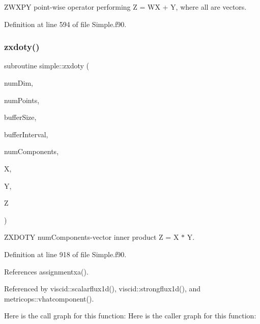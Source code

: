 Z\+W\+X\+PY point-\/wise operator performing Z = WX + Y, where all are vectors. 



Definition at line 594 of file Simple.\+f90.

\hypertarget{namespacesimple_a2b4272d0270d7a065ce43682e88e3cf6}{}\label{namespacesimple_a2b4272d0270d7a065ce43682e88e3cf6} 
\subsubsection{\texorpdfstring{zxdoty()}{zxdoty()}}
{\footnotesize\ttfamily subroutine simple\+::zxdoty (\begin{DoxyParamCaption}\item[{integer(kind=4), intent(in)}]{num\+Dim,  }\item[{integer(kind=8), intent(in)}]{num\+Points,  }\item[{integer(kind=8), dimension(numdim), intent(in)}]{buffer\+Size,  }\item[{integer(kind=8), dimension(2$\ast$numdim), intent(in)}]{buffer\+Interval,  }\item[{integer(kind=4), intent(in)}]{num\+Components,  }\item[{real(kind=8), dimension(numpoints$\ast$numcomponents), intent(in)}]{X,  }\item[{real(kind=8), dimension(numpoints$\ast$numcomponents), intent(in)}]{Y,  }\item[{real(kind=8), dimension(numpoints), intent(out)}]{Z }\end{DoxyParamCaption})}



Z\+X\+D\+O\+TY num\+Components-\/vector inner product Z = X $\ast$ Y. 



Definition at line 918 of file Simple.\+f90.



References assignmentxa().



Referenced by viscid\+::scalarflux1d(), viscid\+::strongflux1d(), and metricops\+::vhatcomponent().

Here is the call graph for this function\+:
Here is the caller graph for this function\+:
\hypertarget{namespacesimple_aecc214bc1a98be128c68622243d11e0a}{}\label{namespacesimple_aecc214bc1a98be128c68622243d11e0a} 
